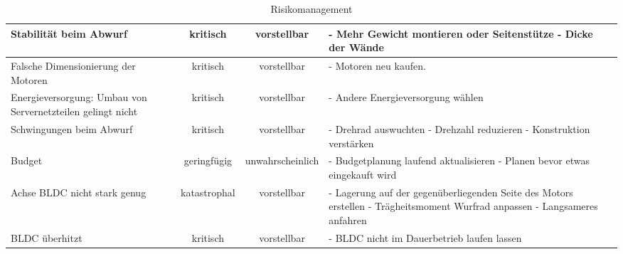 \begin{landscape}
\begin{table}
\begin{tabular}{|p{5cm}|c|c|p{9cm}|}
			\hline \rowcolor{yellow} \hline Stabilität beim Abwurf & kritisch & vorstellbar &
			- Mehr Gewicht montieren oder Seitenstütze \newline
			- Dicke der Wände \\ 
			
			\hline \rowcolor{yellow} \hline Falsche Dimensionierung der Motoren & kritisch & vorstellbar &
			- Motoren neu kaufen. \\
			
			\hline \rowcolor{yellow} \hline Energieversorgung: Umbau von Servernetzteilen gelingt nicht & kritisch & vorstellbar &
			- Andere Energieversorgung wählen \\ 
			
			\hline \rowcolor{yellow} \hline Schwingungen beim Abwurf & kritisch & vorstellbar &
			- Drehrad auswuchten \newline
			- Drehzahl reduzieren \newline
			- Konstruktion verstärken \\
			
			\hline \rowcolor{green} \hline Budget & geringfügig & unwahrscheinlich &
			- Budgetplanung laufend aktualisieren  \newline 
			- Planen bevor etwas eingekauft wird \\
			
			\hline \rowcolor{yellow} \hline Achse BLDC nicht stark genug & katastrophal & vorstellbar &
			- Lagerung auf der gegenüberliegenden Seite des Motors erstellen \newline
			- Trägheitsmoment Wurfrad anpassen \newline
			- Langsameres anfahren \\
			
			\hline \rowcolor{yellow} \hline BLDC überhitzt & kritisch & vorstellbar &
			- BLDC nicht im Dauerbetrieb laufen lassen \newline
			
			
			
		\end{tabular}
		\caption{Risikomanagement}
		\label{tab:risikomanagement}
	\end{table} 
\end{landscape}